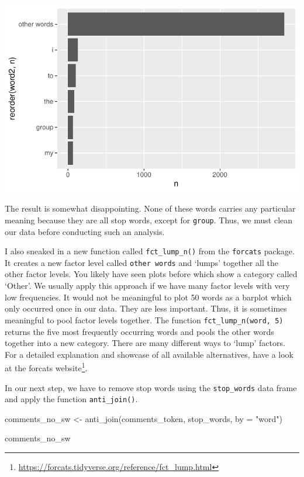 \documentclass[
  letterpaper,
]{krantz}
\makeatletter
\newenvironment{Shaded}{\begin{snugshade}}{\end{snugshade}}
\newcommand{\AttributeTok}[1]{\textcolor[rgb]{0.40,0.45,0.13}{#1}}
\newcommand{\FunctionTok}[1]{\textcolor[rgb]{0.28,0.35,0.67}{#1}}
\newcommand{\NormalTok}[1]{\textcolor[rgb]{0.00,0.23,0.31}{#1}}
\newcommand{\OtherTok}[1]{\textcolor[rgb]{0.00,0.23,0.31}{#1}}
\newcommand{\StringTok}[1]{\textcolor[rgb]{0.13,0.47,0.30}{#1}}
\renewcommand{\href}[2]{#2\footnote{\url{#1}}}
\newenvironment{kframe}{%
\medskip{}
\setlength{\fboxsep}{.8em}
 \def\at@end@of@kframe{}%
 \ifinner\ifhmode%
  \def\at@end@of@kframe{\end{minipage}}%
  \begin{minipage}{\columnwidth}%
 \fi\fi%
 \def\FrameCommand##1{\hskip\@totalleftmargin \hskip-\fboxsep
 \colorbox{shadecolor}{##1}\hskip-\fboxsep
     \hskip-\linewidth \hskip-\@totalleftmargin \hskip\columnwidth}%
 \MakeFramed {\advance\hsize-\width
   \@totalleftmargin\z@ \linewidth\hsize
   \@setminipage}}%
 {\par\unskip\endMakeFramed%
 \at@end@of@kframe}
\renewenvironment{Shaded}{\begin{kframe}}{\end{kframe}}
\makeatother
\begin{document}
\includegraphics{14_mixed_methods_files/figure-pdf/freq-words-before-stopwords-removal-1.pdf}

The result is somewhat disappointing. None of these words carries any
particular meaning because they are all stop words, except for
\texttt{group}. Thus, we must clean our data before conducting such an
analysis.

I also sneaked in a new function called \texttt{fct\_lump\_n()} from the
\texttt{forcats} package. It creates a new factor level called
\texttt{other\ words} and `lumps' together all the other factor levels.
You likely have seen plots before which show a category called `Other'.
We usually apply this approach if we have many factor levels with very
low frequencies. It would not be meaningful to plot 50 words as a
barplot which only occurred once in our data. They are less important.
Thus, it is sometimes meaningful to pool factor levels together. The
function \texttt{fct\_lump\_n(word,\ 5)} returns the five most
frequently occurring words and pools the other words together into a new
category. There are many different ways to `lump' factors. For a
detailed explanation and showcase of all available alternatives, have a
look at the
\href{https://forcats.tidyverse.org/reference/fct_lump.html}{forcats
website}.

In our next step, we have to remove stop words using the
\texttt{stop\_words} data frame and apply the function
\texttt{anti\_join()}.

\begin{Shaded}
\begin{Highlighting}[]
\NormalTok{comments\_no\_sw }\OtherTok{\textless{}{-}} \FunctionTok{anti\_join}\NormalTok{(comments\_token, stop\_words,}
                          \AttributeTok{by =} \StringTok{"word"}\NormalTok{)}

\NormalTok{comments\_no\_sw}
\end{Highlighting}
\end{Shaded}
\end{document}
